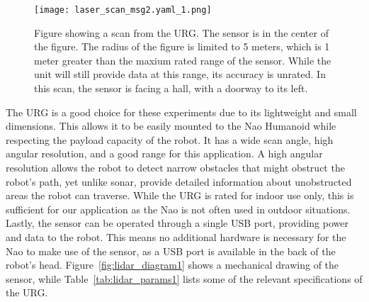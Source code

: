 \begin{figure}
\centering
\texttt{[image: laser\_scan\_msg2.yaml\_1.png]}
\caption{Figure showing a scan from the URG\@.
         The sensor is in the center of the figure.
         The radius of the figure is limited to 5 meters, which is 1 meter 
         greater than the maxium rated range of the sensor. While the unit will
         still provide data at this range, its accuracy is unrated.
         In this scan, the sensor is facing a hall, with a doorway to its left.}
\label{fig:lidar_scan1}
\end{figure}

The URG is a good choice for these experiments due to its lightweight and small
dimensions. This allows it to be easily mounted to the Nao Humanoid while
respecting the payload capacity of the robot. It has a wide scan angle, high
angular resolution, and a good range for this application. A high angular
resolution allows the robot to detect narrow obstacles that might obstruct the
robot's path, yet unlike sonar, provide detailed information about unobstructed
areas the robot can traverse. While the URG is rated for indoor use only, this
is sufficient for our application as the Nao is not often used in outdoor 
situations. Lastly, the sensor can be operated through a single USB port,
providing power and data to the robot. This means no additional hardware is 
necessary for the Nao to make use of the sensor, as a USB port is available
in the back of the robot's head.
Figure~\ref{fig:lidar_diagram1} shows a mechanical drawing of the sensor, while
Table~\ref{tab:lidar_params1} lists some of the relevant specifications of the
URG.


